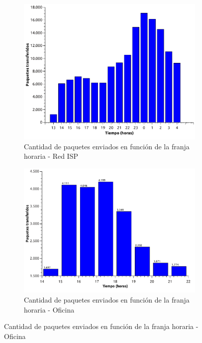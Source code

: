 \begin{figure}[H]
        \begin{subfigure}[H]{0.5\textwidth}
                \centering
                \includegraphics[width=1\textwidth]{graficos/paquetesVsTiempoCasa.pdf}
                \caption{Cantidad de paquetes enviados en funci\'on de la franja horaria - Red ISP}
                \label{fig:paquetes1}
        \end{subfigure}
        \begin{subfigure}[H]{0.5\textwidth}
                \centering
                \includegraphics[width=1\textwidth]{graficos/paquetesVsTiempoOficina.pdf}
                \caption{Cantidad de paquetes enviados en funci\'on de la franja horaria - Oficina}
                \label{fig:paquetes2}
        \end{subfigure}
\end{figure}
